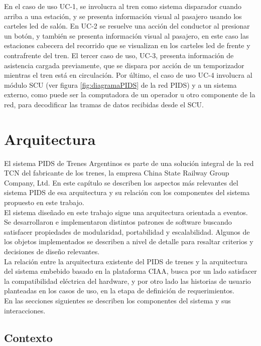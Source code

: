 En el caso de uso UC-1, se involucra al tren como sistema disparador cuando arriba a una estación, y se presenta información visual al pasajero usando los carteles led de salón. En UC-2 se resuelve una acción del conductor al presionar un botón, y también se presenta información visual al pasajero, en este caso las estaciones cabecera del recorrido que se visualizan en los carteles led de frente y contrafrente del tren. El tercer caso de uso, UC-3, presenta información de asistencia cargada previamente, que se dispara por acción de un temporizador mientras el tren está en circulación. Por último, el caso de uso UC-4 involucra al módulo SCU (ver figura  \ref{fig:diagramaPIDS} de la red PIDS) y a un sistema externo, como puede ser la computadora de un operador u otro componente de la red, para decodificar las tramas de datos recibidas desde el SCU.\\

\section{Arquitectura}

El sistema PIDS de Trenes Argentinos es parte de una solución integral de la red TCN del fabricante de los trenes, la empresa China State Railway Group Company, Ltd. En este capítulo se describen los aspectos más relevantes del sistema PIDS de esa arquitectura y su relación con los componentes del sistema propuesto en este trabajo.\\

El sistema diseñado en este trabajo sigue una arquitectura orientada a eventos. Se desarrollaron e implementaron distintos patrones de software buscando satisfacer propiedades de modularidad, portabilidad y escalabilidad. Algunos de los objetos implementados se describen a nivel de detalle para resaltar criterios y decisiones de diseño relevantes. \\

La relación entre la arquitectura existente del PIDS de trenes y la arquitectura del sistema embebido basado en la plataforma CIAA, busca por un lado satisfacer la compatibilidad eléctrica del hardware, y por otro lado las historias de usuario planteadas en los casos de uso, en la etapa de definición de requerimientos. \\

En las secciones siguientes se describen los componentes del sistema y sus interacciones. \

\subsection{Contexto}

